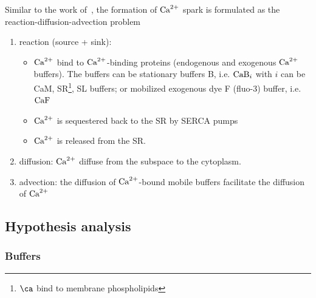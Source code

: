 Similar to the work of~\citep{pratusevich1996}, the formation of ${\text{Ca}^{2+}}$
spark is formulated as the reaction-diffusion-advection problem
\begin{enumerate}

\item reaction (source + sink):
  \begin{itemize}
  \item ${\text{Ca}^{2+}}$ bind to ${\text{Ca}^{2+}}$-binding proteins (endogenous and
    exogenous ${\text{Ca}^{2+}}$ buffers).  The buffers can be stationary buffers
    B, i.e. $\ce{CaB_i}$ with $i$ can be CaM,
    SR\footnote{$\ca$ bind to membrane phospholipids}, SL buffers; or
    mobilized exogenous dye F (fluo-3) buffer, i.e. $\ce{CaF}$

  \item ${\text{Ca}^{2+}}$ is sequestered back to the SR by SERCA pumps

  \item ${\text{Ca}^{2+}}$ is released from the SR.
  \end{itemize}

\item diffusion: ${\text{Ca}^{2+}}$ diffuse from the subspace to the cytoplasm. 

\item advection: the diffusion of ${\text{Ca}^{2+}}$-bound mobile buffers
  facilitate the diffusion of ${\text{Ca}^{2+}}$
\end{enumerate}




\subsection{Hypothesis analysis}
\label{sec:hypothesis-analysis-9}



\subsubsection{Buffers}
\label{sec:buffers}

